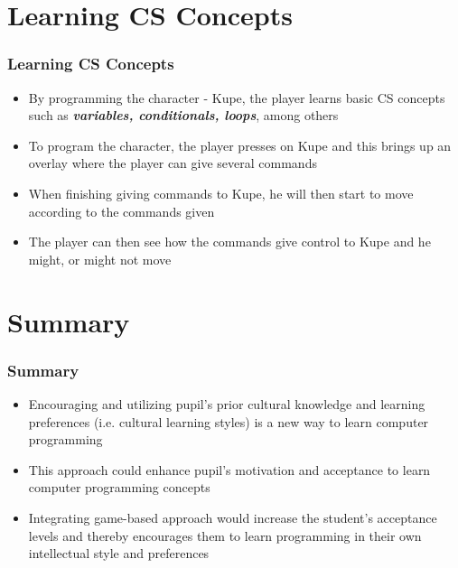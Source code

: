 \documentclass[aspectratio=169]{beamer}
\begin{document}
\section{Learning CS Concepts}
\begin{frame}
\frametitle{Learning CS Concepts}

\begin{itemize}
\item  By programming the character - Kupe, the player learns basic CS concepts such as \textbf{\textit{ variables, conditionals, loops}}, among others
\newline
\item To program the character, the player presses on Kupe and this
brings up an overlay where the player can give several commands
\newline	
\item When finishing giving commands to Kupe, he will then start to move according to the commands given
\newline	
\item The player can then see how the commands give control to Kupe and he might, or might not move 	
\end{itemize}
\end{frame}

\section{Summary}
\begin{frame}
\frametitle{Summary}

\begin{itemize}
\item  Encouraging and utilizing pupil’s prior cultural knowledge and learning preferences (i.e. cultural learning styles) is a new way to learn computer programming 
\newline
\item This approach could enhance pupil's motivation and acceptance to learn computer programming concepts
\newline	
\item Integrating game-based approach would increase the student's acceptance levels and thereby encourages them to learn programming in their own intellectual style and preferences 
\newline	
\end{itemize}
\end{frame}
\ThankYouFrame
\end{document}
